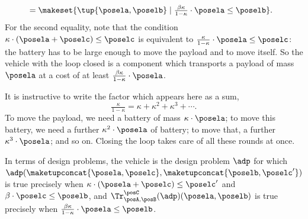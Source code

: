 \begin{example}
\begin{equation}
\begin{aligned}
             & = \makeset{ \tup{\posela, \poselb} \mid \tfrac{\beta \kappa}{1 - \kappa} \cdot \posela \leq \poselb }.
        \end{aligned}
    \end{equation}
    For the second equality, note that the condition $\kappa \cdot (\posela + \poselc) \leq \poselc$ is equivalent to $\tfrac{\kappa}{1 - \kappa} \cdot \posela \leq \poselc$: the battery has to be large enough to move the payload and to move itself.
    So the vehicle with the loop closed is a component which transports a payload of mass $\posela$ at a cost of at least $\tfrac{\beta \kappa}{1 - \kappa} \cdot \posela$.

    It is instructive to write the factor which appears here as a sum,
    \begin{equation}
        \tfrac{\kappa}{1 - \kappa} = \kappa + \kappa^2 + \kappa^3 + \cdots.
    \end{equation}
    To move the payload, we need a battery of mass $\kappa \cdot \posela$; to move this battery, we need a further $\kappa^2 \cdot \posela$ of battery; to move that, a further $\kappa^3 \cdot \posela$; and so on.
    Closing the loop takes care of all these rounds at once.

    In terms of design problems, the vehicle is the design problem $\adp$ for which $\adp(\maketupconcat{\posela, \poselc}, \maketupconcat{\poselb, \poselc'})$ is true precisely when $\kappa \cdot (\posela + \poselc) \leq \poselc'$ and $\beta \cdot \poselc \leq \poselb$, and $\Tr_{\posA,\posB}^{\posC}(\adp)(\posela, \poselb)$ is true precisely when $\tfrac{\beta \kappa}{1 - \kappa} \cdot \posela \leq \poselb$.
\end{example}

